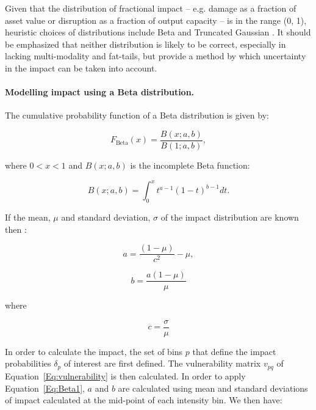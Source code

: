 \documentclass[a4paper,11pt]{extarticle} %
\begin{document}
Given that the distribution of fractional impact -- e.g. damage  as a fraction of asset value or disruption as a fraction of output capacity -- is in the range  (0, 1), heuristic choices of distributions include Beta and Truncated Gaussian \cite{MitchellEtAl:2017}. It should be emphasized that neither distribution is likely to be correct, especially in lacking multi-modality and fat-tails, but provide a method by which uncertainty in the impact can be taken into account.

\paragraph{Modelling impact using a Beta distribution.}
The cumulative probability function of a Beta distribution is given by:

\begin{equation}
	\label{Eq:Beta1}
	F_{\text{Beta}}(x) = \frac{B(x; a, b)}{B(1; a, b)} ,
\end{equation}

where $0 < x < 1$ and $B(x; a, b)$ is the incomplete Beta function:

\begin{equation}
	\label{Eq:IncompleteBeta}
	B(x; a, b) = \int_0^{x} t^{a-1} (1 - t)^{b-1} dt .
\end{equation}

If the mean, $\mu$ and standard deviation, $\sigma$ of the impact distribution are known then \cite{MitchellEtAl:2017}:

\begin{equation}
	\label{Eq:BetaA}
	a = \frac{(1 - \mu)}{c^2} - \mu ,
\end{equation}

\begin{equation}
	\label{Eq:BetaB}
	b = \frac{a(1 - \mu)}{\mu}
\end{equation}

where

\begin{equation}
	\label{Eq:BetaC}
	c = \frac{\sigma}{\mu}
\end{equation}

In order to calculate the impact, the set of bins $p$ that define the impact probabilities $\delta_p$ of interest are first defined. The vulnerability matrix $v_{pq}$ of Equation~\ref{Eq:vulnerability} is then calculated. In order to apply Equation~\ref{Eq:Beta1}, $a$ and $b$ are calculated using mean and standard deviations of impact calculated at the mid-point of each intensity bin. We then have:
\end{document}
